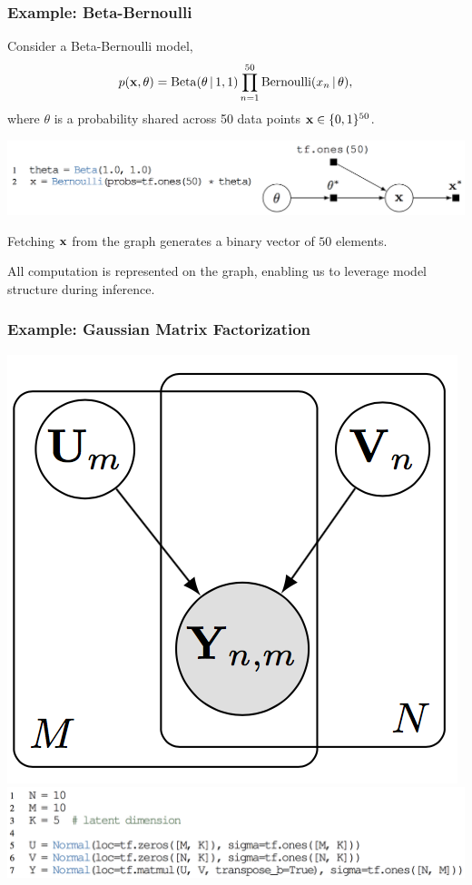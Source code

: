 \documentclass[10pt,
               xcolor={usenames,dvipsnames},
               hyperref={colorlinks,linktoc=all,citecolor=Plum,linkcolor=MidnightBlue,urlcolor=MidnightBlue},noamssymb]{beamer}
\begin{document}
\begin{frame}
\frametitle{Example: Beta-Bernoulli}
Consider a Beta-Bernoulli model,
\begin{align*}
p(\boldsymbol{\mathbf{x}}, \theta) =
\operatorname{Beta}(\theta\,|\, 1, 1)
\prod_{n=1}^{50} \operatorname{Bernoulli}(x_n\,|\, \theta),
\end{align*}
where $\theta$
is a probability shared across 50 data points $\boldsymbol{\mathbf{x}}\in\{0,1\}^{50}$.
\begin{center}
\vspace{-2ex}
\includegraphics[height=0.175\textwidth]{img/beta-bernoulli.png}
\end{center}
Fetching $\boldsymbol{\mathbf{x}}$ from the graph generates a binary vector of $50$ elements.

All computation is represented on the graph, enabling us to leverage model structure during inference.
\end{frame}

\begin{frame}
\frametitle{Example: Gaussian Matrix Factorization}
\begin{center}
\includegraphics[height=0.3\textwidth]{img/gaussian_mf_graph.png}
\\
\includegraphics[height=0.2\textwidth]{img/gaussian_mf_program.png}
\end{center}
\end{frame}
\end{document}
